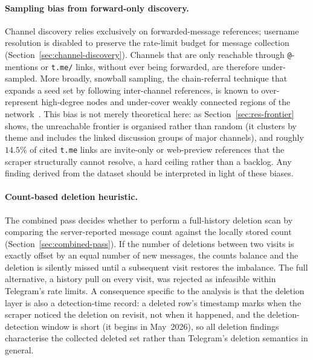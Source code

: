 \paragraph{Sampling bias from forward-only discovery.}
Channel discovery relies exclusively on forwarded-message references; username resolution is disabled to preserve the rate-limit budget for message collection (Section~\ref{sec:channel-discovery}). Channels that are only reachable through \texttt{@}-mentions or \texttt{t.me/} links, without ever being forwarded, are therefore under-sampled. More broadly, snowball sampling, the chain-referral technique that expands a seed set by following inter-channel references, is known to over-represent high-degree nodes and under-cover weakly connected regions of the network~\cite{wagner2017}. This bias is not merely theoretical here: as Section~\ref{sec:res-frontier} shows, the unreachable frontier is organised rather than random (it clusters by theme and includes the linked discussion groups of major channels), and roughly $14.5\%$ of cited \texttt{t.me} links are invite-only or web-preview references that the scraper structurally cannot resolve, a hard ceiling rather than a backlog. Any finding derived from the dataset should be interpreted in light of these biases.

\paragraph{Count-based deletion heuristic.}
The combined pass decides whether to perform a full-history deletion scan by comparing the server-reported message count against the locally stored count (Section~\ref{sec:combined-pass}). If the number of deletions between two visits is exactly offset by an equal number of new messages, the counts balance and the deletion is silently missed until a subsequent visit restores the imbalance. The full alternative, a history pull on every visit, was rejected as infeasible within Telegram's rate limits. A consequence specific to the analysis is that the deletion layer is also a detection-time record: a deleted row's timestamp marks when the scraper noticed the deletion on revisit, not when it happened, and the deletion-detection window is short (it begins in May~2026), so all deletion findings characterise the collected deleted set rather than Telegram's deletion semantics in general.

